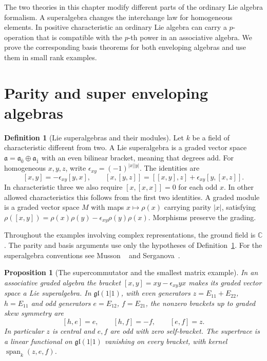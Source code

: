 \documentclass[11pt,oneside,openany]{book}
\newtheorem{proposition}[theorem]{Proposition}
\theoremstyle{definition}
\newtheorem{definition}[theorem]{Definition}
\theoremstyle{remark}
\begin{document}
The two theories in this chapter modify different parts of the ordinary
Lie algebra formalism. A superalgebra changes the interchange law for
homogeneous elements. In positive characteristic an ordinary Lie
algebra can carry a \(p\)-operation that is compatible with the
\(p\)-th power in an associative algebra. We prove the corresponding
basis theorems for both enveloping algebras and use them in small
rank examples.

\section{Parity and super enveloping algebras}

\begin{definition}[Lie superalgebras and their modules]
\label{res:SR01}
Let \(k\) be a field of characteristic different from two.
A Lie superalgebra is a graded vector space
\(\mathfrak a=\mathfrak a_{\overline 0}\oplus\mathfrak a_{\overline 1}\)
with an even bilinear bracket, meaning that degrees add. For
homogeneous \(x,y,z\), write
\(\epsilon_{xy}=(-1)^{|x||y|}\).
The identities are
\[
 [x,y]=-\epsilon_{xy}[y,x],
 \qquad [x,[y,z]]=[[x,y],z]+\epsilon_{xy}[y,[x,z]].
\]
In characteristic three we also require
\([x,[x,x]]=0\) for each odd \(x\). In other allowed characteristics
this follows from the first two identities. A graded module is a
graded vector space \(M\) with maps \(x\mapsto \rho(x)\) carrying
parity \(|x|\), satisfying
\(\rho([x,y])=\rho(x)\rho(y)-\epsilon_{xy}\rho(y)\rho(x)\).
Morphisms preserve the grading.
\end{definition}

Throughout the examples involving complex representations, the
ground field is \(\mathbb C\). The parity and basis arguments
use only the hypotheses of Definition~\ref{res:SR01}.
For the superalgebra conventions see Musson
~\cite[Section 1.1, PDF pp.~22--24]{musson}
and Serganova~\cite[Section 2]{serganova}.

\begin{proposition}[The supercommutator and the smallest matrix example]
\label{res:SR02}
In an associative graded algebra the bracket
\([x,y]=xy-\epsilon_{xy}yx\) makes its graded vector space a
Lie superalgebra. In \(\mathfrak{gl}(1|1)\), with even
generators \(z=E_{11}+E_{22}\), \(h=E_{11}\) and odd
generators \(e=E_{12}\), \(f=E_{21}\), the nonzero brackets
up to graded skew symmetry are
\[
 [h,e]=e,\qquad [h,f]=-f,\qquad [e,f]=z .
\]
In particular \(z\) is central and \(e,f\) are odd with
zero self-bracket. The supertrace is a linear functional
on \(\mathfrak{gl}(1|1)\) vanishing on every bracket, with
kernel \(\operatorname{span}_k(z,e,f)\).
\end{proposition}
\end{document}
